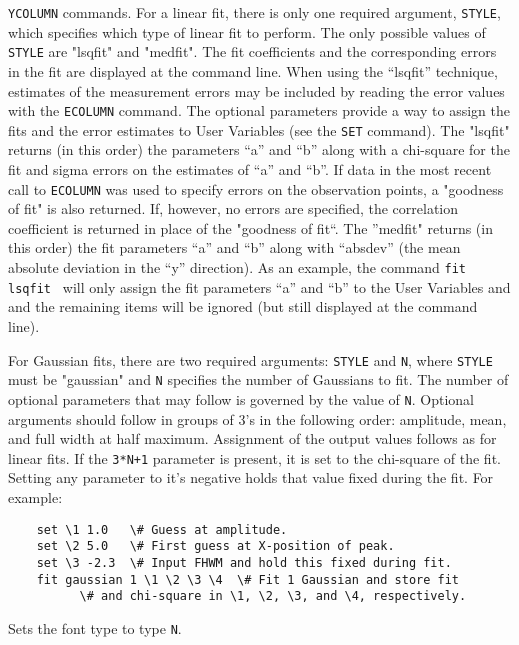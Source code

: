 	{\tt YCOLUMN} commands.  For a
	linear fit, there is only one required argument, {\tt STYLE},
	which specifies which type of linear fit to perform.  The only
	possible values of {\tt STYLE} are "lsqfit" and "medfit".
	The fit coefficients and the corresponding errors in the fit are
	displayed at the command line.  When using the ``lsqfit'' technique,
	estimates of the measurement errors may be included by reading the
	error values with the {\tt ECOLUMN}
	command.  The optional parameters provide a way to assign the fits
	and the error estimates to User Variables (see the
	{\tt SET} command).  The "lsqfit" returns
	(in this order) the parameters ``a'' and ``b'' along with a chi-square
	for the fit and sigma errors on the estimates of ``a'' and ``b''.  If data
	in the most recent call to {\tt ECOLUMN}
	was used to specify errors on the observation points, a "goodness
	of fit" is also returned.  If, however, no errors are specified,
	the correlation coefficient is returned in place of the "goodness
	of fit``.  The ''medfit" returns (in this order) the fit parameters
	``a'' and ``b'' along with ``absdev'' (the mean absolute deviation in
	the ``y'' direction).  As an example, the command
	{\tt fit lsqfit  }
	will only assign the fit parameters ``a'' and ``b'' to the User
	Variables  and  and the remaining items will be ignored (but
	still displayed at the command line).
	\par 
	For Gaussian fits, there are two required arguments:
	{\tt STYLE} and {\tt N}, where {\tt STYLE}
	must be "gaussian" and {\tt N} specifies the number of
	Gaussians to fit.  The number of optional parameters that
	may follow is governed by the value of {\tt N}.  Optional
	arguments should follow in groups of 3's in the following order:
	amplitude, mean, and full width at half maximum.  Assignment of the
	output values follows as for linear fits.  If the {\tt 3*N+1}
	parameter is present, it is set to the chi-square of the fit.
	Setting any parameter to it's negative holds that value fixed
	during the fit.  For example:
	\begin{verbatim}
    set \1 1.0   \# Guess at amplitude.
    set \2 5.0   \# First guess at X-position of peak.
    set \3 -2.3  \# Input FHWM and hold this fixed during fit.
    fit gaussian 1 \1 \2 \3 \4  \# Fit 1 Gaussian and store fit
          \# and chi-square in \1, \2, \3, and \4, respectively.
	\end{verbatim}
\item [{\tt FONT N } --] Sets the font type to type {\tt N}.\\
